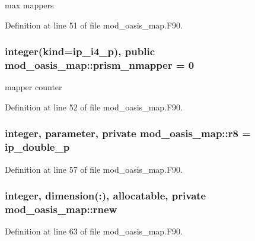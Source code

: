 max mappers 



Definition at line 51 of file mod\+\_\+oasis\+\_\+map.\+F90.

\hypertarget{classmod__oasis__map_af543b83ec5bed63a4448ff641137b0c5}{
\subsubsection[{prism\+\_\+nmapper}]{\setlength{\rightskip}{0pt plus 5cm}integer(kind=ip\+\_\+i4\+\_\+p), public mod\+\_\+oasis\+\_\+map\+::prism\+\_\+nmapper = 0}}\label{classmod__oasis__map_af543b83ec5bed63a4448ff641137b0c5}


mapper counter 



Definition at line 52 of file mod\+\_\+oasis\+\_\+map.\+F90.

\hypertarget{classmod__oasis__map_a30ebe320b9e4c06a1ee1f2a0bbacf2c4}{
\subsubsection[{r8}]{\setlength{\rightskip}{0pt plus 5cm}integer, parameter, private mod\+\_\+oasis\+\_\+map\+::r8 = ip\+\_\+double\+\_\+p\hspace{0.3cm}{\ttfamily [private]}}}\label{classmod__oasis__map_a30ebe320b9e4c06a1ee1f2a0bbacf2c4}


Definition at line 57 of file mod\+\_\+oasis\+\_\+map.\+F90.

\hypertarget{classmod__oasis__map_a2575785d3ea5e1a37c7f6303f00eb727}{
\subsubsection[{rnew}]{\setlength{\rightskip}{0pt plus 5cm}integer, dimension(\+:), allocatable, private mod\+\_\+oasis\+\_\+map\+::rnew\hspace{0.3cm}{\ttfamily [private]}}}\label{classmod__oasis__map_a2575785d3ea5e1a37c7f6303f00eb727}


Definition at line 63 of file mod\+\_\+oasis\+\_\+map.\+F90.

